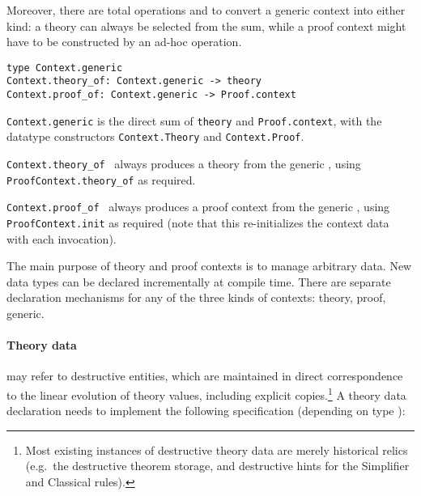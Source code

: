 \begin{isabellebody}
\begin{isamarkuptext}
  Moreover, there are total operations  and  to convert a generic context into either kind: a theory
  can always be selected from the sum, while a proof context might
  have to be constructed by an ad-hoc  operation.%
\end{isamarkuptext}%
\isamarkuptrue%
%
\isadelimmlref
%
\endisadelimmlref
%
\isatagmlref
%
\begin{isamarkuptext}%
\begin{mldecls}
  \verb|type Context.generic| \\
  \verb|Context.theory_of: Context.generic -> theory| \\
  \verb|Context.proof_of: Context.generic -> Proof.context| \\
  \end{mldecls}

  \begin{description}

  \item \verb|Context.generic| is the direct sum of \verb|theory| and \verb|Proof.context|, with the datatype
  constructors \verb|Context.Theory| and \verb|Context.Proof|.

  \item \verb|Context.theory_of|~ always produces a
  theory from the generic , using \verb|ProofContext.theory_of| as required.

  \item \verb|Context.proof_of|~ always produces a
  proof context from the generic , using \verb|ProofContext.init| as required (note that this re-initializes the
  context data with each invocation).

  \end{description}%
\end{isamarkuptext}%
\isamarkuptrue%
%
\endisatagmlref
{\isafoldmlref}%
%
\isadelimmlref
%
\endisadelimmlref
%
\isamarkuptrue%
%
\begin{isamarkuptext}%
The main purpose of theory and proof contexts is to manage arbitrary
  data.  New data types can be declared incrementally at compile time.
  There are separate declaration mechanisms for any of the three kinds
  of contexts: theory, proof, generic.

  \paragraph{Theory data} may refer to destructive entities, which are
  maintained in direct correspondence to the linear evolution of
  theory values, including explicit copies.\footnote{Most existing
  instances of destructive theory data are merely historical relics
  (e.g.\ the destructive theorem storage, and destructive hints for
  the Simplifier and Classical rules).}  A theory data declaration
  needs to implement the following specification (depending on type
  ):


\end{isamarkuptext}
\end{isabellebody}
